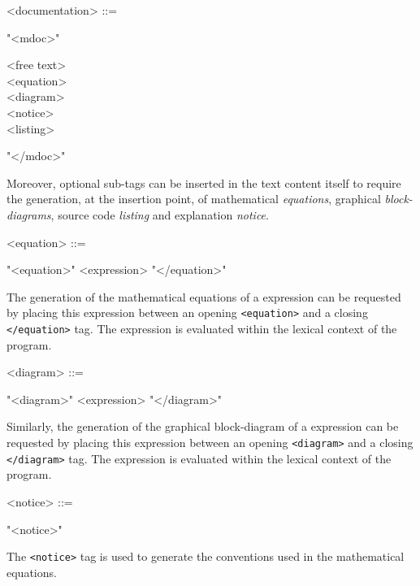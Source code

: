 \documentclass[a4paper]{book}
\begin{document}
\begin{grammar}
  <documentation> ::= 
  \begin{syntdiag}
    "<mdoc>"     
	\begin{stack}
      <free text>\\
      <equation>\\
      <diagram>\\
      <notice>\\
	  <listing>
    \end{stack}
    "</mdoc>"
  \end{syntdiag}
\end{grammar}

Moreover, optional sub-tags can be inserted in the text content itself to require the generation, at the insertion point, of mathematical \textit{equations}, graphical \textit{block-diagrams}, \faust source code \textit{listing} and explanation \textit{notice}.

\begin{grammar}
  <equation> ::= 
  \begin{syntdiag}
    "<equation>" <expression> "</equation>"
  \end{syntdiag}
\end{grammar}

The generation of the mathematical equations of a \faust expression can be requested by placing this expression between an opening \lstinline'<equation>' and a closing \lstinline'</equation>' tag. The expression is evaluated within the lexical context of the \faust program.

\begin{grammar}
  <diagram> ::= 
  \begin{syntdiag}
    "<diagram>" <expression> "</diagram>"
  \end{syntdiag}
\end{grammar}

Similarly, the generation of the graphical block-diagram of a \faust expression can be requested by placing this expression between an opening \lstinline'<diagram>' and a closing \lstinline'</diagram>' tag. The expression is evaluated within the lexical context of the \faust program.

\begin{grammar}
  <notice> ::= 
  \begin{syntdiag}
    "<notice>"
  \end{syntdiag}
\end{grammar}

The \lstinline'<notice>' tag is used to generate the conventions used in the mathematical equations.
\end{document}
